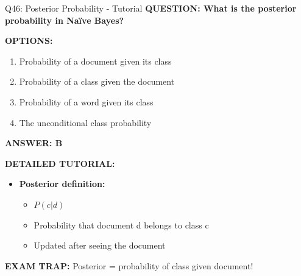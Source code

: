 \documentclass[8pt]{beamer}
\begin{document}
	\begin{frame}{Q46: Posterior Probability - Tutorial}
		\fontsize{6.5}{7.5}\selectfont
		\textbf{QUESTION: What is the posterior probability in Naïve Bayes?}
		
		\vspace{0.1cm}
		\textbf{OPTIONS:}
		\begin{enumerate}
			\item Probability of a document given its class
			\item Probability of a class given the document
			\item Probability of a word given its class
			\item The unconditional class probability
		\end{enumerate}
		
		\vspace{0.1cm}
		\textcolor{myblue}{\textbf{ANSWER: B}}
		
		\vspace{0.1cm}
		\textbf{DETAILED TUTORIAL:}
		\begin{itemize}
			\item \textbf{Posterior definition:}
			\begin{itemize}
				\item $P(c|d)$
				\item Probability that document d belongs to class c
				\item Updated after seeing the document
			\end{itemize}
		\end{itemize}
		
		\textcolor{myred}{\textbf{EXAM TRAP:}} Posterior = \textcolor{myblue}{probability of class given document}!
	\end{frame}
	
\end{document}
